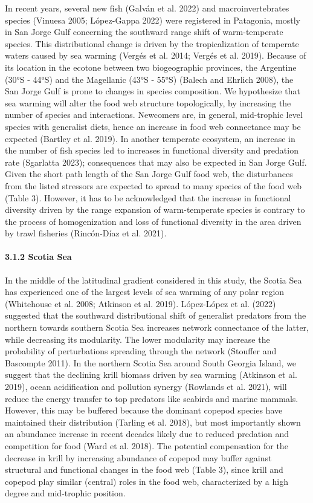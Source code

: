 \documentclass[
]{article}
\begin{document}
In recent years, several new fish (Galván et al. 2022) and
macroinvertebrates species (Vinuesa 2005; López-Gappa 2022) were
registered in Patagonia, mostly in San Jorge Gulf concerning the
southward range shift of warm-temperate species. This distributional
change is driven by the tropicalization of temperate waters caused by
sea warming (Vergés et al. 2014; Vergés et al. 2019). Because of its
location in the ecotone between two biogeographic provinces, the
Argentine (30°S - 44°S) and the Magellanic (43°S - 55°S) (Balech and
Ehrlich 2008), the San Jorge Gulf is prone to changes in species
composition. We hypothesize that sea warming will alter the food web
structure topologically, by increasing the number of species and
interactions. Newcomers are, in general, mid-trophic level species with
generalist diets, hence an increase in food web connectance may be
expected (Bartley et al. 2019). In another temperate ecosystem, an
increase in the number of fish species led to increases in functional
diversity and predation rate (Sgarlatta 2023); consequences that may
also be expected in San Jorge Gulf. Given the short path length of the
San Jorge Gulf food web, the disturbances from the listed stressors are
expected to spread to many species of the food web (Table 3). However,
it has to be acknowledged that the increase in functional diversity
driven by the range expansion of warm-temperate species is contrary to
the process of homogenization and loss of functional diversity in the
area driven by trawl fisheries (Rincón-Díaz et al. 2021).

\paragraph{3.1.2 Scotia Sea}\label{scotia-sea-1}

In the middle of the latitudinal gradient considered in this study, the
Scotia Sea has experienced one of the largest levels of sea warming of
any polar region (Whitehouse et al. 2008; Atkinson et al. 2019).
López-López et al. (2022) suggested that the southward distributional
shift of generalist predators from the northern towards southern Scotia
Sea increases network connectance of the latter, while decreasing its
modularity. The lower modularity may increase the probability of
perturbations spreading through the network (Stouffer and Bascompte
2011). In the northern Scotia Sea around South Georgia Island, we
suggest that the declining krill biomass driven by sea warming (Atkinson
et al. 2019), ocean acidification and pollution synergy (Rowlands et al.
2021), will reduce the energy transfer to top predators like seabirds
and marine mammals. However, this may be buffered because the dominant
copepod species have maintained their distribution (Tarling et al.
2018), but most importantly shown an abundance increase in recent
decades likely due to reduced predation and competition for food (Ward
et al. 2018). The potential compensation for the decrease in krill by
increasing abundance of copepod may buffer against structural and
functional changes in the food web (Table 3), since krill and copepod
play similar (central) roles in the food web, characterized by a high
degree and mid-trophic position.
\end{document}
